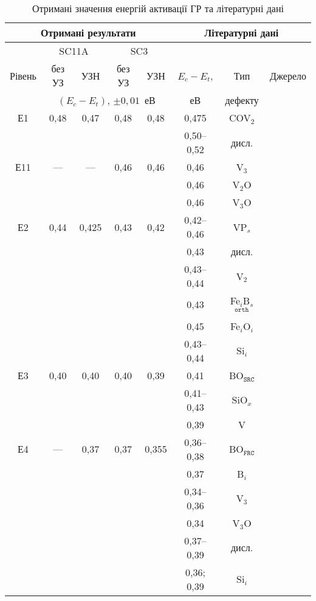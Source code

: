 \begin{table}
\caption{\label{tabBulEtUSL}Отримані значення енергій активації ГР та літературні дані
}
\renewcommand{\tabcolsep}{1.5mm}
\begin{tabular}{|c|c|c|c|c|c|c|c|}
\hline
\multicolumn{5}{|c|}{Отримані результати}&\multicolumn{3}{c|}{Літературні дані}\\ \hline
&\multicolumn{2}{c|}{SC11A}&\multicolumn{2}{c|}{SC3}&&&\\ \cline{2-5}
Рівень&без УЗ&УЗН&без УЗ&УЗН&$E_c-E_t$,&Тип&Джерело\\ \cline{2-5}
&\multicolumn{4}{c|}{$(E_c-E_t)$, $\pm0,01$~еВ}&еВ&дефекту&\\
\hhline{|========|}
Е1&0,48&0,47&0,48&0,48&0,475&COV$_2$&\cite{Lugakov}\\\cline{6-8}
&&&&&0,50--0,52&дисл.&\cite{Edis:Ogawa,Edis:Omling,Kittler2003}\\ \hline
Е11&---&---&0,46&0,46&0,46&V$_3$&\cite{V3:PRB2012,V3:Markevich}\\ \cline{6-8}
&&&&&0,46&V$_2$O&\cite{V2:JAP2014}\\ \cline{6-8}
&&&&&0,46&V$_3$O&\cite{V3:Markevich}\\ \hline
Е2&0,44&0,425&0,43&0,42&0,42--0,46&VP$_s$&\cite{VI:Luc,Kuchinskii,Karazh,Ecentre:2005}\\ \cline{6-8}
&&&&&0,43&дисл.&\cite{SiO:Vanhell}\\ \cline{6-8}
&&&&&0,43--0,44&V$_2$&\cite{V2:JAP2014,V2:PRB2002}\\ \cline{6-8}
&&&&&0,43&Fe$_i$B$_s$$^\mathtt{orth}$&\cite{FeB:PhysRevB49,Istratov1999}\\ \cline{6-8}
&&&&&0,45&Fe$_i$O$_i$&\cite{FeO}\\ \cline{6-8}
&&&&&0,43--0,44&Si$_i$&\cite{VI:Luc,Si:Sii}\\ \hline
Е3&0,40&0,40&0,40&0,39&0,41&BO$_\mathtt{SRC}$&\cite{LIDRev,LIDRev2,Rein,LID:SchmidtJMR}\\ \cline{6-8}
&&&&&0,41--0,43&SiO$_x$&\cite{SiO:Mchedlidze,SiO:Vanhell,SiO:Chan}\\ \cline{6-8}
&&&&&0,39&V&\cite{MSER55}\\ \hline
Е4&---&0,37&0,37&0,355&0,36--0,38&BO$_\mathtt{FRC}$& \cite{LIDRev2,BOSingle:SEMSS2017}\\ \cline{6-8}
&&&&&0,37&B$_i$&\cite{Lugakov}\\ \cline{6-8}
&&&&&0,34--0,36&V$_3$&\cite{V3:PRB2012,V3:Markevich}\\ \cline{6-8}
&&&&&0,34&V$_3$O&\cite{V3:Markevich}\\ \cline{6-8}
&&&&&0,37--0,39&дисл.&\cite{PhysRevB56:10208,kveder2008,SiO:Hwang,disl10:Isakova,Kittler2003}\\ \cline{6-8}
&&&&&0,36; 0,39&Si$_i$&\cite{MSER55,Si:Sii}\\ \hline
\end{tabular}
\end{table}



